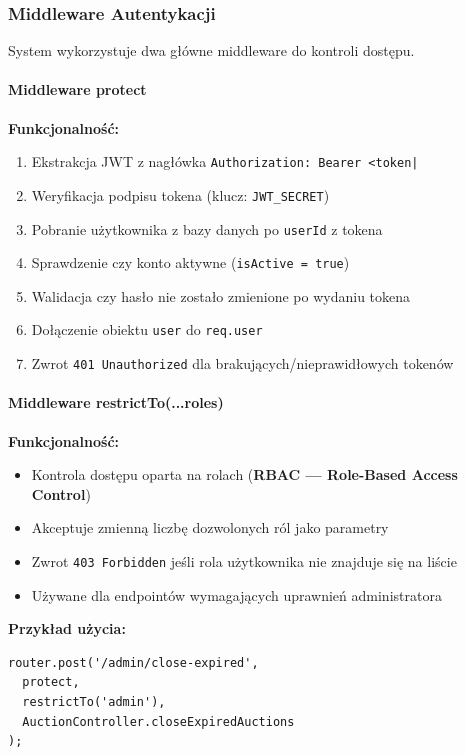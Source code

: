 \subsubsection{Middleware Autentykacji}

System wykorzystuje dwa główne middleware do kontroli dostępu.

\paragraph{Middleware protect}

\textbf{Funkcjonalność:}
\begin{enumerate}
  \item Ekstrakcja JWT z nagłówka \texttt{Authorization: Bearer <token|}
  \item Weryfikacja podpisu tokena (klucz: \texttt{JWT\_SECRET})
  \item Pobranie użytkownika z bazy danych po \texttt{userId} z tokena
  \item Sprawdzenie czy konto aktywne (\texttt{isActive = true})
  \item Walidacja czy hasło nie zostało zmienione po wydaniu tokena
  \item Dołączenie obiektu \texttt{user} do \texttt{req.user}
  \item Zwrot \texttt{401 Unauthorized} dla brakujących/nieprawidłowych tokenów
\end{enumerate}

\paragraph{Middleware restrictTo(...roles)}

\textbf{Funkcjonalność:}
\begin{itemize}
  \item Kontrola dostępu oparta na rolach (\textbf{RBAC --- Role-Based Access Control})
  \item Akceptuje zmienną liczbę dozwolonych ról jako parametry
  \item Zwrot \texttt{403 Forbidden} jeśli rola użytkownika nie znajduje się na liście
  \item Używane dla endpointów wymagających uprawnień administratora
\end{itemize}

\textbf{Przykład użycia:}
\begin{lstlisting}
router.post('/admin/close-expired',
  protect,
  restrictTo('admin'),
  AuctionController.closeExpiredAuctions
);
\end{lstlisting}

